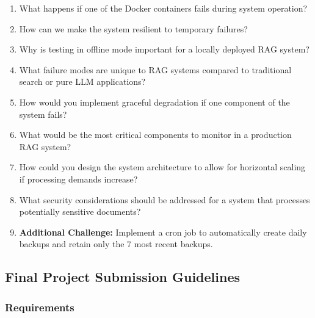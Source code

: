 \documentclass[
  screen,review,acmlarge]{acmart}
\providecommand{\tightlist}{%
  \setlength{\itemsep}{0pt}\setlength{\parskip}{0pt}}
\begin{document}
\begin{enumerate}
\def\labelenumi{\arabic{enumi}.}
\tightlist
\item
  What happens if one of the Docker containers fails during system operation?
\item
  How can we make the system resilient to temporary failures?
\item
  Why is testing in offline mode important for a locally deployed RAG system?
\item
  What failure modes are unique to RAG systems compared to traditional search or pure LLM applications?
\item
  How would you implement graceful degradation if one component of the system fails?
\item
  What would be the most critical components to monitor in a production RAG system?
\item
  How could you design the system architecture to allow for horizontal scaling if processing demands increase?
\item
  What security considerations should be addressed for a system that processes potentially sensitive documents?
\item
  \textbf{Additional Challenge:} Implement a cron job to automatically create daily backups and retain only the 7 most recent backups.
\end{enumerate}

\subsection{Final Project Submission Guidelines}\label{final-project-submission-guidelines}

\subsubsection{Requirements}\label{requirements}
\end{document}
